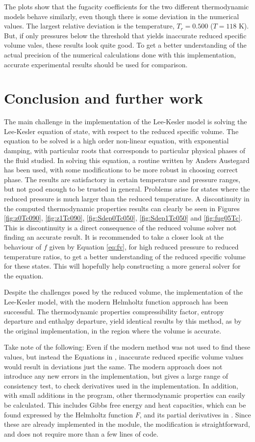 \documentclass[english]{../thermomemo/thermomemo}
\numberwithin{equation}{section}
\begin{document}
The plots show that the fugacity coefficients for the two different thermodynamic models behave similarly, even though there is some deviation in the numerical values. The largest relative deviation is the temperature, $T_r = 0.500$ ($T = 118$ K). But, if only pressures below the threshold that yields inaccurate reduced specific volume vales, these results look quite good. To get a better understanding of the actual precision of the numerical calculations done with this implementation, accurate experimental results should be used for comparison.

\section{Conclusion and further work}
The main challenge in the implementation of the Lee-Kesler model is solving the Lee-Kesler equation of state, with respect to the reduced specific volume. The equation to be solved is a high order non-linear equation, with exponential damping, with particular roots that corresponds to particular physical phases of the fluid studied. In solving this equation, a routine written by Anders Austegard has been used, with some modifications to be more robust in choosing correct phase. The results are satisfactory in certain temperature and pressure ranges, but not good enough to be trusted in general. Problems arise for states where the reduced pressure is much larger than the reduced temperature. A discontinuity in the computed thermodynamic properties results can clearly be seen in Figures \ref{fig:z0Tc090}, \ref{fig:z1Tc090}, \ref{fig:Sdep0Tc050}, \ref{fig:Sdep1Tc050} and \ref{fig:fug05Tc}. This is discontinuity is a direct consequence of the reduced volume solver not finding an accurate result. It is recommended to take a closer look at the behaviour of $f$ given by Equation \ref{eq:fv}, for high reduced pressure to reduced temperature ratios, to get a better understanding of the reduced specific volume for these states. This will hopefully help constructing a more general solver for the equation.

Despite the challenges posed by the reduced volume, the implementation of the Lee-Kesler model, with the modern Helmholtz function approach has been successful. The thermodynamic properties compressibility factor, entropy departure and enthalpy departure, yield identical results by this method, as by the original implementation, in the region where the volume is accurate. 

Take note of the following: Even if the modern method was not used to find these values, but instead the Equations in \cite{LK}, inaccurate reduced specific volume values would result in deviations just the same. The modern approach does not introduce any new errors in the implementation, but gives a large range of consistency test, to check derivatives used in the implementation. In addition, with small additions in the program, other thermodynamic properties can easily be calculated. This includes Gibbs free energy and heat capacities, which can be found expressed by the Helmholtz function $F$, and its partial derivatives in \cite{MM}. Since these are already implemented in the module, the modification is straightforward, and does not require more than a few lines of code.
\end{document}
